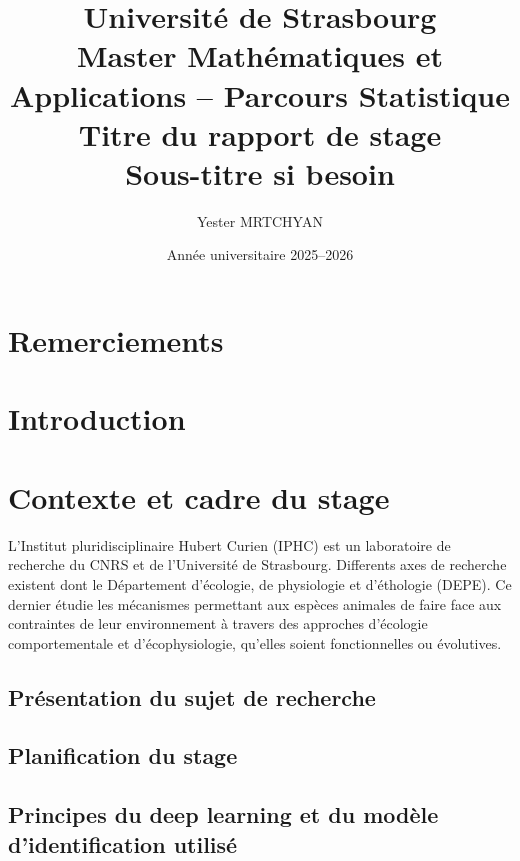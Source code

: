 \documentclass[11pt,a4paper]{report}
\title{
    \Large Université de Strasbourg \\
    \large Master Mathématiques et Applications -- Parcours Statistique \\
    \vspace{1cm}
    \Huge \textbf{Titre du rapport de stage} \\
    \vspace{0.5cm}
    \large Sous-titre si besoin
}
\author{Yester MRTCHYAN}
\date{Année universitaire 2025--2026}
\begin{document}
\maketitle
\thispagestyle{empty}

\chapter*{Remerciements}
\thispagestyle{empty}

\newpage

\tableofcontents
\thispagestyle{empty}

\newpage

\chapter*{Introduction}

\chapter{Contexte et cadre du stage}
L'Institut pluridisciplinaire Hubert Curien (IPHC) est un laboratoire de recherche du CNRS et de l'Université de Strasbourg. 
Differents axes de recherche existent dont le Département d'écologie, de physiologie et d'éthologie (DEPE). 
Ce dernier étudie les mécanismes permettant aux espèces animales de faire face aux contraintes de leur environnement à travers des approches d'écologie comportementale et d'écophysiologie, qu'elles soient fonctionnelles ou évolutives.
\section{Présentation du sujet de recherche}


\section{Planification du stage}

\section{Principes du deep learning et du modèle d'identification utilisé}
\end{document}
